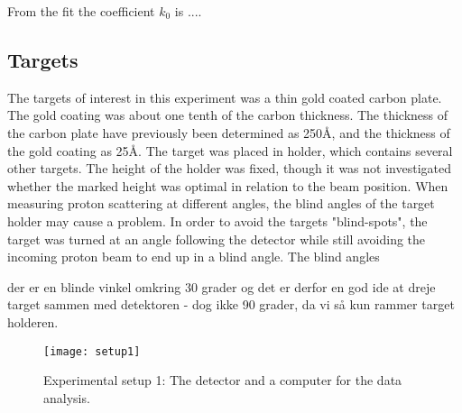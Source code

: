 From the fit the coefficient $k_0$ is .... 


\subsection{Targets}
The targets of interest in this experiment was a thin gold coated carbon plate. The gold coating was about one tenth of the carbon thickness. The thickness of the carbon plate have previously been determined as 250Å, and the thickness of the gold coating as 25Å.\footnotemark {} 
The target was placed in holder, which contains several other targets. The height of the holder was fixed, though it was not investigated whether the marked height was optimal in relation to the beam position.
When measuring proton scattering at different angles, the blind angles of the target holder may cause a problem. In order to avoid the targets "blind-spots", the target was turned at an angle following the detector while still avoiding the incoming proton beam to end up in a blind angle. The blind angles  
  
der er en blinde vinkel omkring 30 grader og det er derfor en god ide at dreje target sammen med detektoren - dog ikke 90 grader, da vi så kun rammer target holderen.







\begin{figure}[h]
\centering
\texttt{[image: setup1]}
\caption{Experimental setup 1: The detector and a computer for the data
analysis.}
\label{fig_setup1}
\end{figure}

